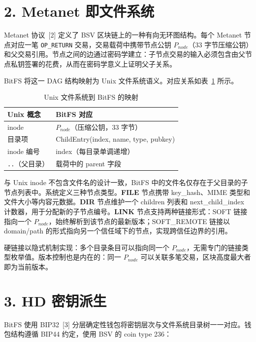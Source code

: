 \documentclass[11pt,a4paper]{article}
\begin{document}
\section{2. Metanet 即文件系统}

Metanet 协议~[2] 定义了 BSV 区块链上的一种有向无环图结构。每个 Metanet 节点对应一笔 \texttt{OP\_RETURN} 交易，交易载荷中携带节点公钥 $P_{node}$（33 字节压缩公钥）和父交易引用。节点之间的边通过密码学建立：子节点交易的输入必须包含由父节点私钥签署的花费，从而在密码学意义上证明父子关系。

BitFS 将这一 DAG 结构映射为 Unix 文件系统语义。对应关系如表~\ref{tab:unix-mapping} 所示。

\begin{table}[htbp]
\centering
\begin{tabular}{ll}
\toprule
\textbf{Unix 概念} & \textbf{BitFS 对应} \\
\midrule
inode & $P_{node}$（压缩公钥，33 字节） \\
目录项 & ChildEntry(index, name, type, pubkey) \\
inode 编号 & index（每目录单调递增） \\
\texttt{..}（父目录） & 载荷中的 parent 字段 \\
\bottomrule
\end{tabular}
\caption{Unix 文件系统到 BitFS 的映射}
\label{tab:unix-mapping}
\end{table}

与 Unix inode 不包含文件名的设计一致，BitFS 中的文件名仅存在于父目录的子节点列表中。系统定义三种节点类型。\textbf{FILE} 节点携带 key\_hash、MIME 类型和文件大小等内容元数据。\textbf{DIR} 节点维护一个 children 列表和 next\_child\_index 计数器，用于分配新的子节点编号。\textbf{LINK} 节点支持两种链接形式：SOFT 链接指向一个 $P_{node}$，始终解析到该节点的最新版本；SOFT\_REMOTE 链接以 domain/path 的形式指向另一个信任域下的节点，实现跨信任边界的引用。

硬链接以隐式机制实现：多个目录条目可以指向同一个 $P_{node}$，无需专门的链接类型枚举值。版本控制也是内在的：同一 $P_{node}$ 可以关联多笔交易，区块高度最大者即为当前版本。

\section{3. HD 密钥派生}

BitFS 使用 BIP32~[3] 分层确定性钱包将密钥层次与文件系统目录树一一对应。钱包结构遵循 BIP44 约定，使用 BSV 的 coin type 236：
\end{document}
